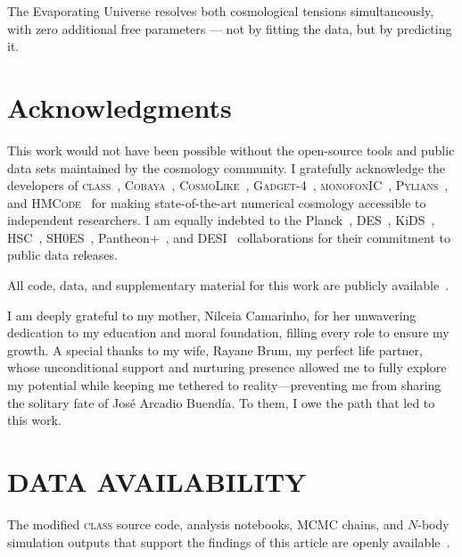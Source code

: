 \documentclass[a4paper,fleqn]{cas-dc}
\begin{document}
The Evaporating Universe resolves both cosmological
tensions simultaneously, with zero additional free
parameters --- not by fitting the data, but by
predicting it.


\section*{Acknowledgments}

This work would not have been possible without the open-source tools and
public data sets maintained by the cosmology community. I gratefully
acknowledge the developers of
\textsc{class}~\cite{blas2011},
\textsc{Cobaya}~\cite{torrado2021},
\textsc{CosmoLike}~\cite{krause2021},
\textsc{Gadget-4}~\cite{gadget4},
\textsc{monofonIC}~\cite{monofonic},
\textsc{Pylians}~\cite{pylians},
and \textsc{HMCode}~\cite{mead2021}
for making state-of-the-art numerical cosmology accessible to
independent researchers. I am equally indebted to the
Planck~\cite{planck2018}, DES~\cite{des2022},
KiDS~\cite{heymans2021},
HSC~\cite{li2023_hsc},
SH0ES~\cite{breuval2024}, Pantheon$+$~\cite{scolnic2022},
and DESI~\cite{desi_dr2_2025}
collaborations for their commitment to public data releases.

All code, data, and supplementary material for this work are
publicly available~\cite{eu_github}.

I am deeply grateful to my mother, Nilceia Camarinho, for her
unwavering dedication to my education and moral foundation,
filling every role to ensure my growth. A special thanks to my
wife, Rayane Brum, my perfect life partner, whose unconditional
support and nurturing presence allowed me to fully explore my
potential while keeping me tethered to reality---preventing me
from sharing the solitary fate of Jos\'e Arcadio
Buend\'ia. To them, I owe the path that led to this work.

\section*{DATA AVAILABILITY}

The modified \textsc{class} source code, analysis notebooks,
MCMC chains, and $N$-body simulation outputs that support the
findings of this article are openly available~\cite{eu_github}.
\end{document}
